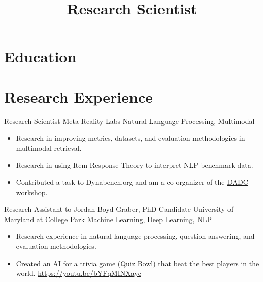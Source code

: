 \documentclass[11pt,a4paper,sans]{moderncv} %
\title{Research Scientist}
\begin{document}
\makecvtitle %
\vspace{-7ex}

\section{Education}





\section{Research Experience}
		{Research Scientist}
		{Meta Reality Labs}
		{Natural Language Processing, Multimodal}
		{}
		{
			\begin{itemize}
				\item Research in improving metrics, datasets, and evaluation methodologies in multimodal retrieval.
				\item Research in using Item Response Theory to interpret NLP benchmark data.
				\item Contributed a task to Dynabench.org and am a co-organizer of the \href{https://dadcworkshop.github.io/}{DADC workshop}.
			\end{itemize}
		}

		{Research Assistant to Jordan Boyd-Graber, PhD Candidate}
		{University of Maryland at College Park}
		{Machine Learning, Deep Learning, NLP}
		{}
		{
			\begin{itemize}
			\item Research experience in natural language processing, question answering, and evaluation methodologies.
      \item Created an AI for a trivia game (Quiz Bowl) that beat the best players in the world. \url{https://youtu.be/bYFqMINXayc}
			\end{itemize}
		}
\end{document}
